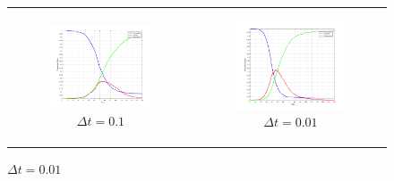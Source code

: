 \begin{figure}
\begin{center}
	\begin{tabular}{c c}
		\begin{subfigure}[b]{0.22\textwidth}
			\centering
			\includegraphics[width=1\textwidth, angle=0]{./fig/step2_yampa/SIR_1000agents_150t_01dt.png}
			\caption{$\Delta t = 0.1$}
			\label{fig:sir_abs_approximating_01dt_1000agents}
		\end{subfigure}
		
		&
    	
		\begin{subfigure}[b]{0.22\textwidth}
			\centering
			\includegraphics[width=1\textwidth, angle=0]{./fig/step2_yampa/SIR_1000agents_150t_001dt.png}
			\caption{$\Delta t = 0.01$}
			\label{fig:sir_abs_approximating_001dt_1000agents}
		\end{subfigure}
	\end{tabular}
	

\end{center}
\end{figure}

